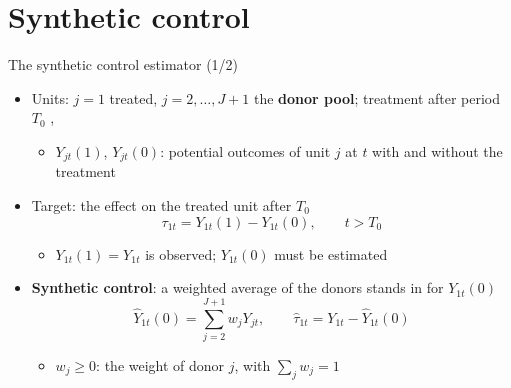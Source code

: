 \section{Synthetic control}

\begin{frame}{The synthetic control estimator (1/2)}
\itemsize{\small}
\begin{itemize}
    \item Units: $j = 1$ treated, $j = 2, \dots, J + 1$ the \textbf{donor pool}; treatment after period $T_0$ , 
    \begin{itemize}
        \item $Y_{jt}(1)$, $Y_{jt}(0)$: potential outcomes of unit $j$ at $t$ with and without the treatment
    \end{itemize}
    \item Target: the effect on the treated unit after $T_0$ \[ \tau_{1t} = Y_{1t}(1) - Y_{1t}(0), \qquad t > T_0 \]
    \begin{itemize}
        \item $Y_{1t}(1) = Y_{1t}$ is observed; $Y_{1t}(0)$ must be estimated
    \end{itemize}
    \item \textbf{Synthetic control}: a weighted average of the donors stands in for $Y_{1t}(0)$ \[ \hat Y_{1t}(0) = \sum_{j=2}^{J+1} w_jY_{jt}, \qquad \hat\tau_{1t} = Y_{1t} - \hat Y_{1t}(0) \]
    \begin{itemize}
        \item $w_j \ge 0$: the weight of donor $j$, with $\sum_j w_j = 1$
    \end{itemize}
\end{itemize}
\end{frame}

